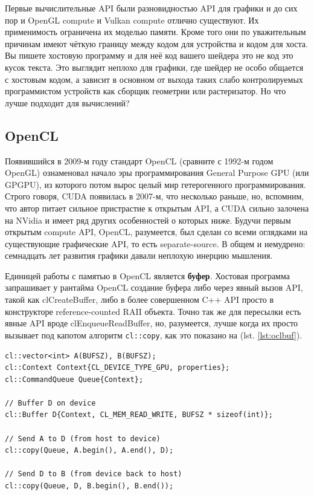 \documentclass[a4paper,12pt,oneside]{article}
\begin{document}
Первые вычислительные API были разновидностью API для графики и до сих пор и OpenGL compute и Vulkan compute отлично существуют.
Их применимость ограничена их моделью памяти.
Кроме того они по уважительным причинам имеют чёткую границу между кодом для устройства и кодом для хоста.
Вы пишете хостовую программу и для неё код вашего шейдера это не код это кусок текста.
Это выглядит неплохо для графики, где шейдер не особо общается с хостовым кодом, а зависит в основном от выхода таких слабо контролируемых программистом устройств как сборщик геометрии или растеризатор.
Но что лучше подходит для вычислений?

\subsection{OpenCL}\label{subsec:opencl}

Появившийся в 2009-м году стандарт OpenCL (сравните с 1992-м годом OpenGL) ознаменовал начало эры программирования General Purpose GPU (или GPGPU), из которого потом вырос целый мир гетерогенного программирования.
Строго говоря, CUDA появилась в 2007-м, что несколько раньше, но, вспомним, что автор питает сильное пристрастие к открытым API, а CUDA сильно залочена на NVidia и имеет ряд других особенностей о которых ниже.
Будучи первым открытым compute API, OpenCL, разумеется, был сделан со всеми оглядками на существующие графические API, то есть separate-source. В общем и немудрено: семнадцать лет развития графики давали неплохую инерцию мышления.

Единицей работы с памятью в OpenCL является \textbf{буфер}.
Хостовая программа запрашивает у рантайма OpenCL создание буфера либо через явный вызов API, такой как clCreateBuffer, либо в более совершенном C++ API просто в конструкторе reference-counted RAII объекта.
Точно так же для пересылки есть явные API вроде clEnqueueReadBuffer, но, разумеется, лучше когда их просто вызывает под капотом алгоритм \lstinline!cl::copy!, как это показано на (lst. \ref{lst:oclbuf}).

\begin{lstlisting}[caption={Пересылка буфера, OpenCL},label={lst:oclbuf}]
cl::vector<int> A(BUFSZ), B(BUFSZ);
cl::Context Context{CL_DEVICE_TYPE_GPU, properties};
cl::CommandQueue Queue{Context};

// Buffer D on device
cl::Buffer D{Context, CL_MEM_READ_WRITE, BUFSZ * sizeof(int)};

// Send A to D (from host to device)
cl::copy(Queue, A.begin(), A.end(), D);

// Send D to B (from device back to host)
cl::copy(Queue, D, B.begin(), B.end());
\end{lstlisting}
\end{document}
